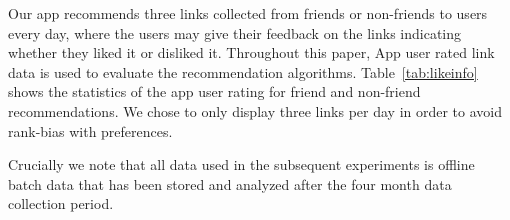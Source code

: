
Our app recommends three links collected from friends or non-friends to users every day, 
where the users may give their feedback on the links indicating whether they liked it or
disliked it. Throughout this paper, App user rated link data is used to evaluate the recommendation algorithms.
Table~\ref{tab:likeinfo} shows the statistics of the app user rating
for friend and non-friend recommendations.  We chose to only display
three links per day in order to avoid rank-bias with preferences.

Crucially we note that all data used in the subsequent experiments
is offline batch data that has been stored and analyzed after the four month
data collection period.  
      							

